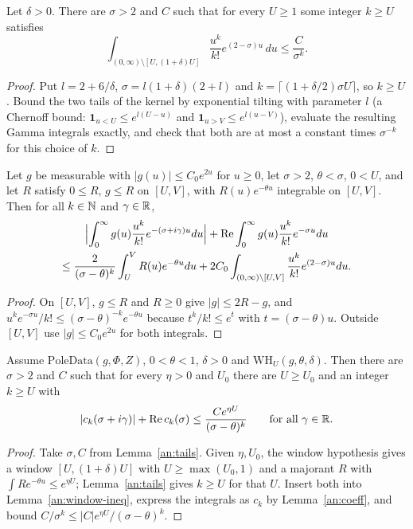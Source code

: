 \begin{lemma}\label{an:tails}
Let $\delta>0$. There are $\sigma>2$ and $C$ such that for every
$U\ge1$ some integer $k\ge U$ satisfies
\[
\int_{(0,\infty)\setminus[U,(1+\delta)U]}\frac{u^k}{k!}e^{(2-\sigma)u}\,du\le\frac{C}{\sigma^k}.
\]
\end{lemma}
\begin{proof}
Put $l=2+6/\delta$, $\sigma=l(1+\delta)(2+l)$ and
$k=\lceil(1+\delta/2)\sigma U\rceil$, so $k\ge U$. Bound the two tails
of the kernel by exponential tilting with parameter $l$ (a Chernoff
bound: $\mathbf 1_{u<U}\le e^{l(U-u)}$ and
$\mathbf 1_{u>V}\le e^{l(u-V)}$), evaluate the resulting Gamma integrals
exactly, and check that both are at most a constant times $\sigma^{-k}$
for this choice of $k$.
\end{proof}

\begin{lemma}\label{an:window-ineq}
Let $g$ be measurable with $|g(u)|\le C_0e^{2u}$ for $u\ge0$, let
$\sigma>2$, $\theta<\sigma$, $0<U$, and let $R$ satisfy $0\le R$, $g\le R$
on $[U,V]$, with $R(u)e^{-\theta u}$ integrable on $[U,V]$. Then for all
$k\in\N$ and $\gamma\in\R$,
\begin{multline*}
\Bigl|\int_0^{\infty} g(u)\frac{u^k}{k!}e^{-(\sigma+i\gamma)u}du\Bigr|
+\Re\int_0^{\infty} g(u)\frac{u^k}{k!}e^{-\sigma u}du\\
\le\frac{2}{(\sigma-\theta)^k}\int_U^VR(u)e^{-\theta u}du
+2C_0\int_{(0,\infty)\setminus[U,V]}\frac{u^k}{k!}e^{(2-\sigma)u}du.
\end{multline*}
\end{lemma}
\begin{proof}
On $[U,V]$, $g\le R$ and $R\ge0$ give $|g|\le 2R-g$, and
$u^ke^{-\sigma u}/k!\le(\sigma-\theta)^{-k}e^{-\theta u}$ because
$t^k/k!\le e^t$ with $t=(\sigma-\theta)u$. Outside $[U,V]$ use
$|g|\le C_0e^{2u}$ for both integrals.
\end{proof}

\begin{lemma}\label{an:window-key}
Assume $\mathrm{PoleData}(g,\Phi,Z)$, $0<\theta<1$, $\delta>0$ and
$\mathrm{WH}_U(g,\theta,\delta)$. Then there are $\sigma>2$ and $C$ such
that for every $\eta>0$ and $U_0$ there are $U\ge U_0$ and an integer
$k\ge U$ with
\[
|c_k(\sigma+i\gamma)|+\Re c_k(\sigma)\le\frac{Ce^{\eta U}}{(\sigma-\theta)^k}
\qquad\text{for all }\gamma\in\R.
\]
\end{lemma}
\begin{proof}
Take $\sigma,C$ from Lemma~\ref{an:tails}. Given $\eta,U_0$, the window
hypothesis gives a window $[U,(1+\delta)U]$ with $U\ge\max(U_0,1)$ and a
majorant $R$ with $\int R e^{-\theta u}\le e^{\eta U}$;
Lemma~\ref{an:tails} gives $k\ge U$ for that $U$. Insert both into
Lemma~\ref{an:window-ineq}, express the integrals as $c_k$ by
Lemma~\ref{an:coeff}, and bound $C/\sigma^k\le|C|e^{\eta U}/(\sigma-\theta)^k$.
\end{proof}

